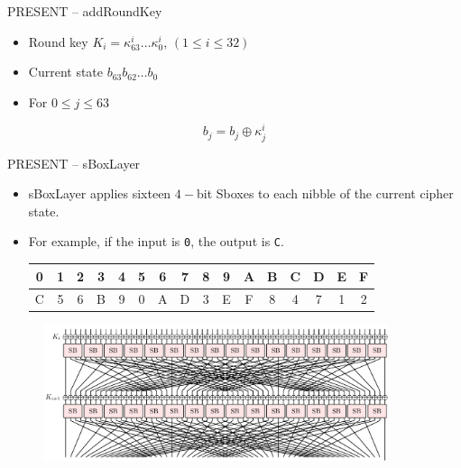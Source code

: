 \begin{frame}{PRESENT -- addRoundKey}
    \begin{itemize}
        \item Round key $K_i=\kappa^i_{63}\dots\kappa_0^i$, $(1\leq i\leq 32)$
        \item Current state $b_{63}b_{62}\dots b_0$
        \item For $0\leq j\leq 63$
    \end{itemize}
    \[
b_j= b_j\oplus\kappa_j^i
\]
\end{frame}

\begin{frame}{PRESENT -- sBoxLayer}
    \begin{itemize}
        \item sBoxLayer applies sixteen $4-$bit Sboxes to each nibble of the current cipher state.
        \item For example, if the input is \texttt{0}, the output is \texttt{C}.
\begin{table}[htb]
\centering
\ttfamily
\begin{tabular}{cccccccccccccccc}\hline
 0 & 1 & 2 & 3 & 4 & 5 & 6 & 7 & 8 & 9 & A & B & C & D & E & F \\\hline
 C & 5 & 6 & B & 9 & 0 & A & D & 3 & E & F & 8 & 4 & 7 & 1 & 2\\\hline
\end{tabular}
\end{table}
    \end{itemize}
\begin{figure}
    \centering
    \includegraphics[width=0.9\textwidth]{fig/PRESENT_two_rounds.pdf}
\end{figure}
\end{frame}



